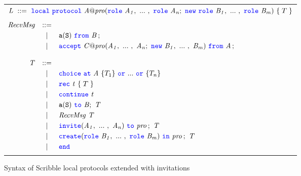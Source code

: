 \documentclass[12pt,twoside]{report}
\begin{document}

\begin{figure}[h!]
    \begin{center}
        \begin{tabular}{l}
            $\mathit{L}\ ::=\ {\color{blue}\mathtt{local}}\ {\color{blue}\mathtt{protocol}}\ \mathit{A@pro}({\color{blue}\mathtt{role}}\ \mathit{A_1},\ ...\ ,\ {\color{blue}\mathtt{role}}\ \mathit{A_n};\ {\color{blue}\mathtt{new}}\ {\color{blue}\mathtt{role}}\ \mathit{B_1},\ ...\ ,\ {\color{blue}\mathtt{role}}\ \mathit{B_m})\ \{\;T\;\}$ \\\\
            \begin{math}
                \begin{array}{@{}rcl}
                    \mathit{RecvMsg} & ::= & \\[2.75pt]
                     & | & \messageFromL{a}{S}{B}\,;\\[2.75pt]
                     & | & \acceptL{C@pro}{A}{B}{A}\,;\\\\
        
                    \mathit{T} & ::= &\\[2.75pt]
                      &   | & \choice\ \at\ \mathit{A}\ \{T_1\}\ \scror\ ...\ \scror\ \{T_n\} \\[2.75pt]
                      &   | & \rec\ \mathit{t}\ \{\;T\;\} \\[2.75pt]
                      &   | &  \continue\ \mathit{t} \\[2.75pt]
                      &   | & \scrmessage{a}{S}\ \scrto\ \mathit{B};\ \mathit{T} \\[2.75pt]
                      &   | & \mathit{RecvMsg}\ \mathit{T}\\[2.75pt]
                      &   | & \invite(\roles{A}{n})\ \scrto\ \mathit{pro}\,;\ \mathit{T} \\[2.75pt]
                      &   | & \create(\rolessig{B}{m})\ \scrin\ \mathit{pro}\,;\ \mathit{T}\\[2.75pt]
                    &   | & \scrend \\[2.75pt]
                \end{array}
            \end{math}
        \end{tabular}
    \end{center}
    \caption{Syntax of Scribble local protocols extended with invitations}
    \label{scr-local-protocols-syntax}
\end{figure}
\end{document}
